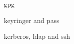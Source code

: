 \documentclass{report}
\begin{document}
gpg

keyringer and pass

kerberos, ldap and ssh
\end{document}
